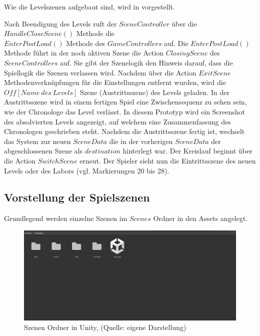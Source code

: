 Wie die Levelszenen aufgebaut sind, wird in  vorgestellt.

Nach Beendigung des Levels ruft der $SceneController$ über die $HandleCloseScene()$ Methode die \\$EnterPostLoad()$ Methode des $GameControllers$ auf. Die $EnterPostLoad()$ Methode führt in der noch aktiven Szene die Action $ClosingScene$ des $SceneControllers$ auf. Sie gibt der Szenelogik den Hinweis darauf, dass die Spiellogik die Szenen verlassen wird. Nachdem über die Action $ExitScene$ Methodenverknüpfungen für die Einstellungen entfernt wurden, wird die $Off[Name~ des~ Levels]$ Szene  (Austrittsszene) des Levels geladen. In der Austrittsszene wird in einem fertigen Spiel eine Zwischensequenz zu sehen sein, wie der Chronologe das Level verlässt. In diesem Prototyp wird ein Screenshot des absolvierten Levels angezeigt, auf welchem eine Zusammenfassung des Chronologen geschrieben steht. Nachdem die Austrittsszene fertig ist, wechselt das System zur neuen $SceneData$ die in der vorherigen $SceneData$ der abgeschlossenen Szene als $destination$ hinterlegt war. Der Kreislauf beginnt über die Action $SwitchScene$ erneut. Der Spieler sieht nun die Eintrittsszene des neuen Levels oder des Labors (vgl. Markierungen 20 bis 28).


\subsection{Vorstellung der Spielszenen}\label{sec:scenes}
Grundlegend werden einzelne Szenen im $Scenes$ Ordner in den Assets angelegt.

\begin{figure}[ht]
\centering
\includegraphics[width=1\linewidth]{content/pictures/Overview.jpg}
\caption{Szenen Ordner in Unity, (Quelle: eigene Darstellung)}
\label{fig:scenes_overview}
\end{figure}

